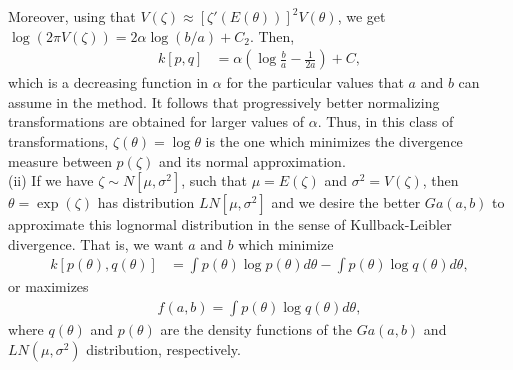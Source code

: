 \documentclass[12pt,a4paper]{article}\usepackage[]{graphicx}\usepackage[]{color}\usepackage{subfigure}
\begin{document}
Moreover, using that $V(\zeta) \approx \left[\zeta'(E(\theta))\right]^2 V(\theta)$, we get $\log(2\pi V(\zeta)) = 2\alpha \log\left(b/a\right)+C_2.$ Then,
\begin{align*}
k[p,q] %
& = \alpha\left(\log \frac{b}{a} -\frac{1}{2a}\right)+C,
\end{align*}
which is a decreasing function in $\alpha$ for the particular values that $a$ and $b$ can assume in the method. It follows that progressively better normalizing transformations are obtained for larger values of $\alpha$. 
Thus, in this class of transformations, $\zeta(\theta)=\log\theta$ is the one which minimizes the divergence measure between $p(\zeta)$ and its normal approximation.\\

(ii) If we have $\zeta\sim N[\mu,\sigma^2]$, such that $\mu=E(\zeta)$ and $\sigma^2=V(\zeta)$, then $\theta=\exp(\zeta)$ has distribution 
$LN[\mu,\sigma^2]$ and we desire the better $Ga(a,b)$ to approximate this lognormal distribution in the sense of Kullback-Leibler divergence. That is, we want $a$ and $b$ which minimize
\begin{align*}
k[p(\theta),q(\theta)] &= \int{p(\theta)\log{p(\theta)}d\theta}-\int{p(\theta)\log{q(\theta)}d\theta},
\end{align*}
or maximizes
\begin{align*}
f(a,b)=\int{p(\theta)\log{q(\theta)}d\theta},
\end{align*}
where $q(\theta)$ and $p(\theta)$ are the density functions of the $Ga(a,b)$ and $LN(\mu,\sigma^2)$ distribution, respectively.
\end{document}
